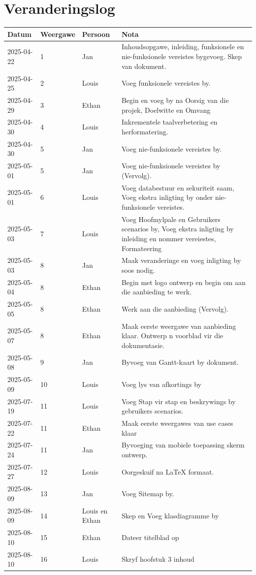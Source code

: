 \chapter{Veranderingslog}

\begin{longtable}{|p{2.5cm}|p{2.5cm}|p{2.5cm}|p{7cm}|}
\hline
\textbf{Datum} & \textbf{Weergawe} & \textbf{Persoon} & \textbf{Nota} \\ \hline
2025-04-22 & 1 & Jan & Inhoudsopgawe, inleiding, funksionele en nie-funksionele vereistes bygevoeg. Skep van dokument. \\ \hline
2025-04-25 & 2 & Louis & Voeg funksionele vereistes by. \\ \hline
2025-04-29 & 3 & Ethan & Begin en voeg by na Oorsig van die projek, Doelwitte en Omvang \\ \hline
2025-04-30 & 4 & Louis & Inkrementele taalverbetering en herformatering. \\ \hline
2025-04-30 & 5 & Jan & Voeg nie-funksionele vereistes by. \\ \hline
2025-05-01 & 5 & Jan & Voeg nie-funksionele vereistes by (Vervolg). \\ \hline
2025-05-01 & 6 & Louis & Voeg databestuur en sekuriteit saam, Voeg ekstra inligting by onder nie-funksionele vereistes. \\ \hline
2025-05-03 & 7 & Louis & Voeg Hoofmylpale en Gebruikers scenarios by, Voeg ekstra inligting by inleiding en nommer vereiestes, Formateering \\ \hline
2025-05-03 & 8 & Jan & Maak veranderinge en voeg inligting by soos nodig. \\ \hline
2025-05-04 & 8 & Ethan & Begin met logo ontwerp en begin om aan die aanbieding te werk. \\ \hline
2025-05-05 & 8 & Ethan & Werk aan die aanbieding (Vervolg). \\ \hline
2025-05-07 & 8 & Ethan & Maak eerste weergawe van aanbieding klaar. Ontwerp n voorblad vir die dokumentasie. \\ \hline
2025-05-08 & 9 & Jan & Byvoeg van Gantt-kaart by dokument. \\ \hline
2025-05-09 & 10 & Louis & Voeg lys van afkortings by \\ \hline
2025-07-19 & 11 & Louis & Voeg Stap vir stap en beskrywings by gebruikers scenarios. \\ \hline
2025-07-22 & 11 & Ethan & Maak eerste weergawes van use cases klaar \\ \hline
2025-07-24 & 11 & Jan & Byvoeging van mobiele toepassing skerm ontwerp. \\ \hline
2025-07-27 & 12 & Louis & Oorgeskuif na LaTeX formaat. \\ \hline
2025-08-09 & 13 & Jan & Voeg Sitemap by. \\ \hline
2025-08-09 & 14 & Louis en Ethan & Skep en Voeg klasdiagramme by \\ \hline
2025-08-10 & 15 & Ethan & Dateer titelblad op \\ \hline
2025-08-10 & 16 & Louis & Skryf hoofstuk 3 inhoud\\ \hline
\end{longtable}

